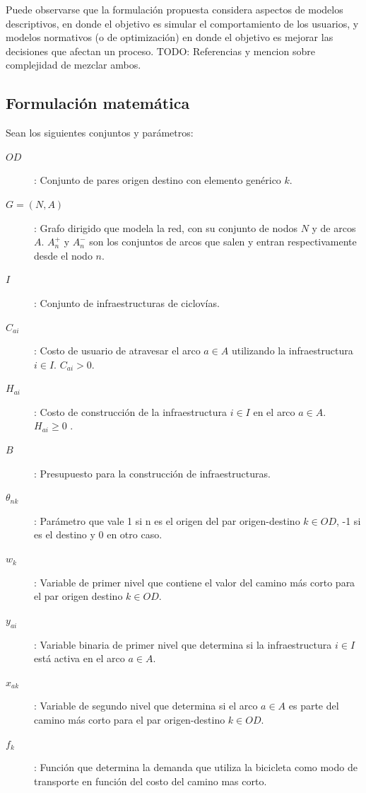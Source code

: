\documentclass{article}
\begin{document}
  Puede observarse que la formulación propuesta considera aspectos de modelos descriptivos, en donde el objetivo es simular el comportamiento de los usuarios, y modelos normativos (o de optimización) en donde el objetivo es mejorar las decisiones que afectan un proceso. TODO: Referencias y mencion sobre complejidad de mezclar ambos.

  \subsection*{Formulación matemática}

  Sean los siguientes conjuntos y parámetros:

  \begin{description}
    \item[$OD$]: Conjunto de pares origen destino con elemento genérico $k$.
    \item[$G=(N,A)$]: Grafo dirigido que modela la red, con su conjunto de nodos $N$ y de arcos $A$. $A_n^+$ y $A_n^-$ son los conjuntos de arcos que salen y entran respectivamente desde el nodo $n$.
    \item[$I$]: Conjunto de infraestructuras de ciclovías.
    \item[$C_{ai}$]: Costo de usuario de atravesar el arco $a \in A$ utilizando la infraestructura $i \in I$. $C_{ai} > 0$.
    \item[$H_{ai}$]: Costo de construcción de la infraestructura $i \in I$ en el arco $a \in A$. $H_{ai} \geq 0$ .
    \item[$B$]: Presupuesto para la construcción de infraestructuras.
    \item[$\theta_{nk}$]: Parámetro que vale 1 si n es el origen del par origen-destino $k \in OD$, -1 si es el destino y 0 en otro caso.
    \item[$w_k$]: Variable de primer nivel que contiene el valor del camino más corto para el par origen destino $k \in OD$.
    \item[$y_{ai}$]: Variable binaria de primer nivel que determina si la infraestructura $i \in I$ está activa en el arco $a \in A$.
    \item[$x_{ak}$]: Variable de segundo nivel que determina si el arco $a \in A$ es parte del camino más corto para el par origen-destino $k \in OD$.
    \item[$f_k$]: Función que determina la demanda que utiliza la bicicleta como modo de transporte en función del costo del camino mas corto.
  \end{description}
\end{document}
